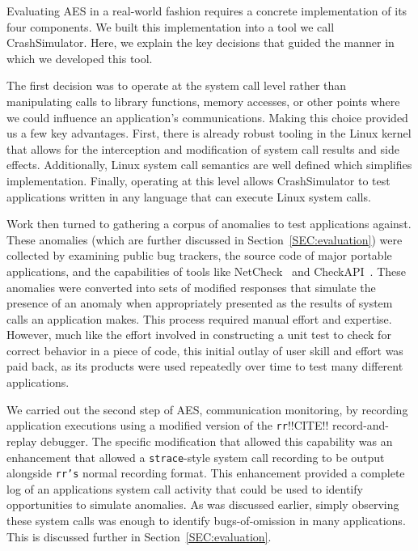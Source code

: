 Evaluating AES in a real-world fashion
requires a concrete implementation of its four components.
We built this implementation into a tool we call CrashSimulator.
Here, we explain the key decisions that guided the manner in which we
developed this tool.

The first decision was
to operate at the system call level
rather than manipulating
calls to library functions,
memory accesses,
or other points where we could influence an application's
communications.
Making this choice provided us a few key advantages.
First, there is already robust tooling in the Linux kernel
that allows for the interception and modification of system call results
and side effects.  Additionally, Linux system call semantics are well
defined which simplifies implementation.  Finally, operating at this level
allows CrashSimulator to test applications written in any language that can
execute Linux system calls.

Work then turned to gathering a corpus of anomalies to test applications
against.  These anomalies (which are further discussed
in Section~\ref{SEC:evaluation})
were collected by examining public bug trackers,
the source code of major portable applications, and the capabilities of
tools like NetCheck~\cite{Zhuang_NSDI_2014}
and CheckAPI~\cite{rasley2015detecting}.  These anomalies were converted
into sets of modified responses
that simulate the presence of an anomaly when
appropriately presented as the results of system calls an application
makes.
This process required manual effort and expertise.  However,
much like
the effort involved in constructing a unit test to check for correct
behavior in a piece of code, this initial outlay of
user skill and effort was paid back, as its products were
used repeatedly over time to test many different applications.

We carried out the second step of AES, communication monitoring, by
recording application executions
using a modified version of the {\tt rr}!!CITE!!
record-and-replay debugger.  The specific modification that allowed this
capability was an enhancement that allowed  a {\tt strace}-style
system call recording to be output alongside {\tt rr's} normal recording
format.
This enhancement provided
a complete log of an applications system call activity
that could be used to identify opportunities to simulate anomalies.  As was
discussed earlier, simply observing these system calls was enough to
identify bugs-of-omission in many applications.  This is discussed further
in Section~\ref{SEC:evaluation}.

